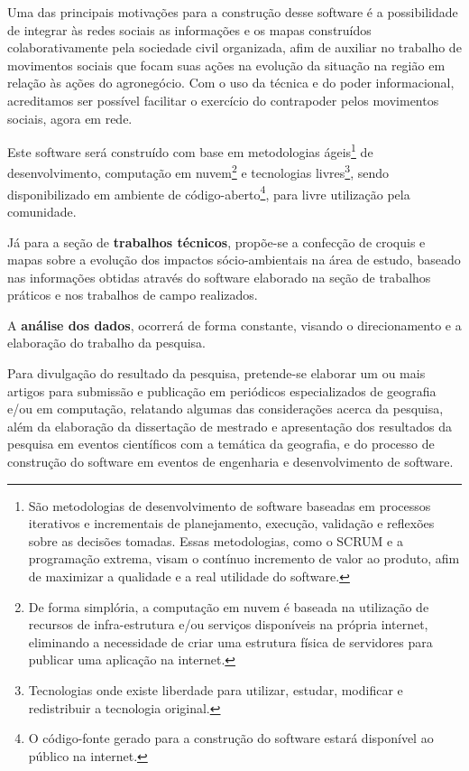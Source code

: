 Uma das principais motivações para a construção desse software é a possibilidade de integrar às redes sociais as informações e os mapas construídos colaborativamente pela sociedade civil organizada, afim de auxiliar no trabalho de movimentos sociais que focam suas ações na evolução da situação na região em relação às ações do agronegócio. Com o uso da técnica e do poder informacional, acreditamos ser possível facilitar o exercício do contrapoder pelos movimentos sociais, agora em rede.

Este software será construído com base em metodologias ágeis\footnote{São metodologias de desenvolvimento de software baseadas em processos iterativos e incrementais de planejamento, execução, validação e reflexões sobre as decisões tomadas. Essas metodologias, como o SCRUM e a programação extrema, visam o contínuo incremento de valor ao produto, afim de maximizar a qualidade e a real utilidade do software.} de desenvolvimento, computação em nuvem\footnote{De forma simplória, a computação em nuvem é baseada na utilização de recursos de infra-estrutura e/ou serviços disponíveis na própria internet, eliminando a necessidade de criar uma estrutura física de servidores para publicar uma aplicação na internet.} e tecnologias livres\footnote{Tecnologias onde existe liberdade para utilizar, estudar, modificar e redistribuir a tecnologia original.}, sendo disponibilizado em ambiente de código-aberto\footnote{O código-fonte gerado para a construção do software estará disponível ao público na internet.}, para livre utilização pela comunidade.

Já para a seção de \textbf{trabalhos técnicos}, propõe-se a confecção de croquis e mapas sobre a evolução dos impactos sócio-ambientais na área de estudo, baseado nas informações obtidas através do software elaborado na seção de trabalhos práticos e nos trabalhos de campo realizados.

A \textbf{análise dos dados}, ocorrerá de forma constante, visando o direcionamento e a elaboração do trabalho da pesquisa. 

Para divulgação do resultado da pesquisa, pretende-se elaborar um ou mais artigos para submissão e publicação em periódicos especializados de geografia e/ou em computação, relatando algumas das considerações acerca da pesquisa, além da elaboração da dissertação de mestrado e apresentação dos resultados da pesquisa em eventos científicos com a temática da geografia, e do processo de construção do software em eventos de engenharia e desenvolvimento de software.

